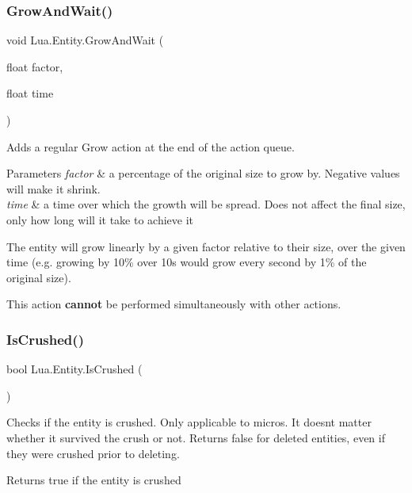 \subsubsection{\texorpdfstring{GrowAndWait()}{GrowAndWait()}}
{\footnotesize\ttfamily void Lua.\+Entity.\+Grow\+And\+Wait (\begin{DoxyParamCaption}\item[{float}]{factor,  }\item[{float}]{time }\end{DoxyParamCaption})}



Adds a regular Grow action at the end of the action queue. 


\begin{DoxyParams}{Parameters}
{\em factor} & a percentage of the original size to grow by. Negative values will make it shrink.\\
\hline
{\em time} & a time over which the growth will be spread. Does not affect the final size, only how long will it take to achieve it\\
\hline
\end{DoxyParams}
The entity will grow linearly by a given factor relative to their size, over the given time (e.\+g. growing by 10\% over 10s would grow every second by 1\% of the original size).

This action {\bfseries{cannot}} be performed simultaneously with other actions. \mbox{\label{class_lua_1_1_entity_a4b4bb9870796b854c0d5666c9cba9375}} 
\subsubsection{\texorpdfstring{IsCrushed()}{IsCrushed()}}
{\footnotesize\ttfamily bool Lua.\+Entity.\+Is\+Crushed (\begin{DoxyParamCaption}{ }\end{DoxyParamCaption})}



Checks if the entity is crushed. Only applicable to micros. It doesn\textquotesingle{}t matter whether it survived the crush or not. Returns false for deleted entities, even if they were crushed prior to deleting. 

\begin{DoxyReturn}{Returns}
true if the entity is crushed
\end{DoxyReturn}
\mbox{\label{class_lua_1_1_entity_a6357c0a54e9aa79beb928d079b42aa76}} 
